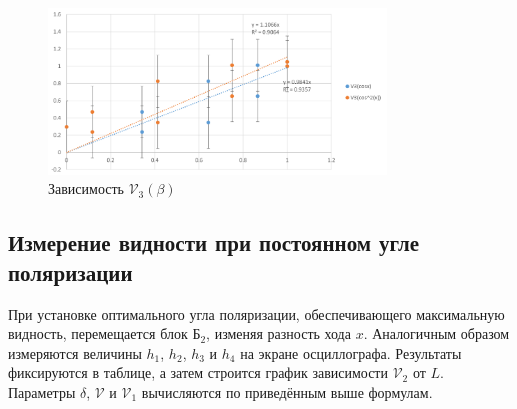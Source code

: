 \documentclass[a4paper]{article}
\begin{document}
\begin{figure}[!h]
\centering
\includegraphics[width=0.8\textwidth]{3.png}
\caption{Зависимость $\mathcal{V}_3(\beta)$}
\label{fig:3}
\end{figure}

\subsection{Измерение видности при постоянном угле поляризации}
При установке оптимального угла поляризации, обеспечивающего максимальную видность, перемещается блок $Б_2$, изменяя разность хода $x$. Аналогичным образом измеряются величины $h_1$, $h_2$, $h_3$ и $h_4$ на экране осциллографа. Результаты фиксируются в таблице, а затем строится график зависимости $\mathcal{V}_2$ от $L$. Параметры $\delta$, $\mathcal{V}$ и $\mathcal{V}_1$ вычисляются по приведённым выше формулам.
\end{document}
